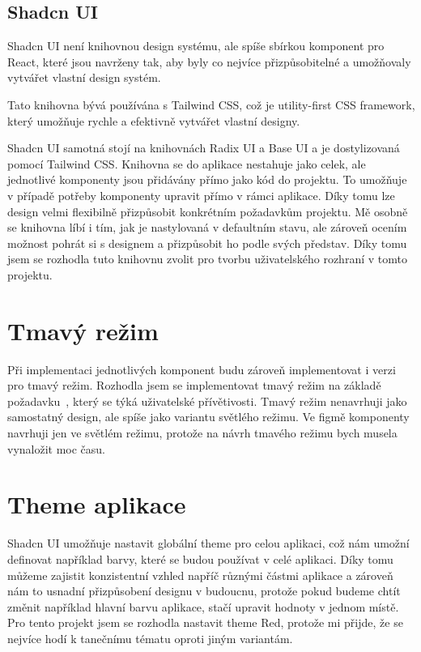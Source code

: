 \subsection{Shadcn UI}
Shadcn UI není knihovnou design systému, ale spíše sbírkou komponent pro React, které jsou navrženy tak, aby byly co nejvíce přizpůsobitelné a umožňovaly vytvářet vlastní design systém.\cite{reactUILibraries}

Tato knihovna bývá používána s Tailwind CSS, což je utility-first CSS framework, který umožňuje rychle a efektivně vytvářet vlastní designy. \cite{tailwindcss}

Shadcn UI samotná stojí na knihovnách Radix UI a Base UI a je dostylizovaná pomocí Tailwind CSS. Knihovna se do aplikace nestahuje jako celek, ale jednotlivé komponenty jsou přidávány přímo jako kód do projektu. To umožňuje v případě potřeby komponenty upravit přímo v rámci aplikace. Díky tomu lze design velmi flexibilně přizpůsobit konkrétním požadavkům projektu. Mě osobně se knihovna líbí i tím, jak je nastylovaná v defaultním stavu, ale zároveň ocením možnost pohrát si s designem a přizpůsobit ho podle svých představ. Díky tomu jsem se rozhodla tuto knihovnu zvolit pro tvorbu uživatelského rozhraní v tomto projektu. \cite{reactUILibraries}

\section{Tmavý režim}
Při implementaci jednotlivých komponent budu zároveň implementovat i verzi pro tmavý režim. Rozhodla jsem se implementovat tmavý režim na základě požadavku~, který se týká uživatelské přívětivosti.
 Tmavý režim nenavrhuji jako samostatný design, ale spíše jako variantu světlého režimu. Ve figmě komponenty navrhuji jen ve světlém režimu, protože na návrh tmavého režimu bych musela vynaložit moc času.


\section{Theme aplikace}
Shadcn UI umožňuje nastavit globální theme pro celou aplikaci, což nám umožní definovat například barvy, které se budou používat v celé aplikaci. Díky tomu můžeme zajistit konzistentní vzhled napříč různými částmi aplikace a zároveň nám to usnadní přizpůsobení designu v budoucnu, protože pokud budeme chtít změnit například hlavní barvu aplikace, stačí upravit hodnoty v jednom místě. Pro tento projekt jsem se rozhodla nastavit theme Red, protože mi přijde, že se nejvíce hodí k tanečnímu tématu oproti jiným variantám. \cite{shadcn_theming_docs}


